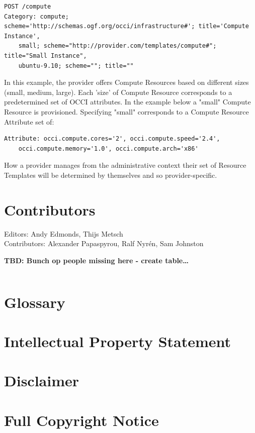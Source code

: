 \documentclass[10pt,a4paper]{article}
\begin{document}
\begin{verbatim}
POST /compute
Category: compute; scheme='http://schemas.ogf.org/occi/infrastructure#'; title='Compute Instance', 
    small; scheme="http://provider.com/templates/compute#"; title="Small Instance", 
    ubuntu-9.10; scheme=""; title=""
\end{verbatim}

In this example, the provider offers Compute Resources based on different sizes (small, medium, large). Each 'size' of Compute Resource corresponds to a predetermined set of OCCI attributes. In the example below a "small" Compute Resource is provisioned. Specifying "small" corresponds to a Compute Resource Attribute set of:

\begin{verbatim}
Attribute: occi.compute.cores='2', occi.compute.speed='2.4', 
    occi.compute.memory='1.0', occi.compute.arch='x86'
\end{verbatim}

How a provider manages from the administrative context their set of Resource Templates will be determined by themselves and so provider-specific.


\section{Contributors}

Editors: Andy Edmonds, Thijs Metsch \\
Contributors: Alexander Papaspyrou, Ralf Nyr\'en, Sam Johnston

\textbf{TBD: Bunch op people missing here - create table\ldots}

\begin{verbatim}

\end{verbatim}

\section{Glossary}


\section{Intellectual Property Statement}


\section{Disclaimer}


\section{Full Copyright Notice}




\end{document}
